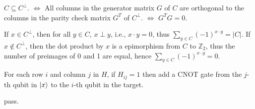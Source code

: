 \ex $C\subseteq C^\perp$.
$\Leftrightarrow$
All columns in the generator matrix $G$ of $C$ are orthogonal to the columns in the parity check matrix $G^T$ of $C^\perp$.
$\Leftrightarrow$
$G^TG=0$.

\ex If $x\in C^\perp$, then for all $y\in C$, $x\perp y$, i.e., $x\cdot y=0$, thus $\sum_{y\in C}(-1)^{x\cdot y}=|C|$.
If $x\notin C^\perp$, then the dot product by $x$ is a epimorphism from $C$ to $\mathbb{Z}_2$, thus the number of preimages of 0 and 1 are equal, hence $\sum_{y\in C}(-1)^{x\cdot y}=0$.

\ex For each row $i$ and column $j$ in $H$, if $H_{ij}=1$ then add a CNOT gate from the $j$-th qubit in $\left|x\right\rangle$ to the $i$-th qubit in the target.

\ex \todo

\ex pass.